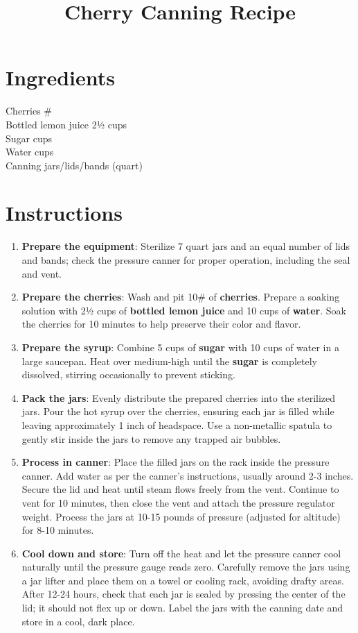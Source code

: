 \documentclass[11pt,letterpaper]{article}
\title{Cherry Canning Recipe}
\author{}
\date{}
\begin{document}
\maketitle
\thispagestyle{empty}

\section*{Ingredients}
\setlength{\columnsep}{20pt}
\begin{multicols}{2}
\noindent
    Cherries \# \\
    Bottled lemon juice \dotfill 2½ cups \\
    Sugar  cups \\
    Water  cups \\
    Canning jars/lids/bands (quart)  \\
\end{multicols}

\section*{Instructions}
\begin{enumerate}
    \item \textbf{Prepare the equipment}: Sterilize 7 quart jars and an equal number of lids and bands; check the pressure canner for proper operation, including the seal and vent.
    \item \textbf{Prepare the cherries}: Wash and pit 10\# of \textbf{cherries}. Prepare a soaking solution with 2½ cups of \textbf{bottled lemon juice} and 10 cups of \textbf{water}. Soak the cherries for 10 minutes to help preserve their color and flavor.
    \item \textbf{Prepare the syrup}: Combine 5 cups of \textbf{sugar} with 10 cups of water in a large saucepan. Heat over medium-high until the \textbf{sugar} is completely dissolved, stirring occasionally to prevent sticking.
    \item \textbf{Pack the jars}: Evenly distribute the prepared cherries into the sterilized jars. Pour the hot syrup over the cherries, ensuring each jar is filled while leaving approximately 1 inch of headspace. Use a non-metallic spatula to gently stir inside the jars to remove any trapped air bubbles.
    \item \textbf{Process in canner}: Place the filled jars on the rack inside the pressure canner. Add water as per the canner's instructions, usually around 2-3 inches. Secure the lid and heat until steam flows freely from the vent. Continue to vent for 10 minutes, then close the vent and attach the pressure regulator weight. Process the jars at 10-15 pounds of pressure (adjusted for altitude) for 8-10 minutes.
    \item \textbf{Cool down and store}: Turn off the heat and let the pressure canner cool naturally until the pressure gauge reads zero. Carefully remove the jars using a jar lifter and place them on a towel or cooling rack, avoiding drafty areas. After 12-24 hours, check that each jar is sealed by pressing the center of the lid; it should not flex up or down. Label the jars with the canning date and store in a cool, dark place.
\end{enumerate}
\end{document}
